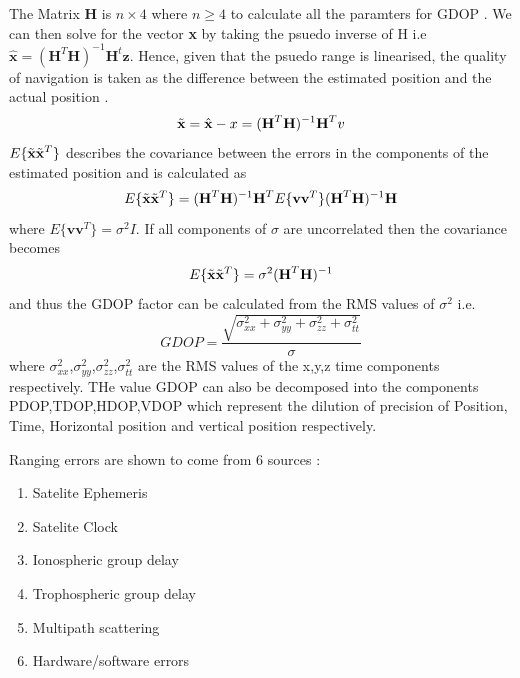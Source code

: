 The Matrix \textbf{H} is $n\times4$ where $n \geq 4$ to calculate all the paramters for GDOP \cite{jwo2001efficient}. We can then solve for the vector \textbf{x} by taking the psuedo inverse of H i.e $\hat{\textbf{x}} = (\textbf{H}^T\textbf{H})^{-1}\textbf{H}^t\textbf{z}$. Hence, given that the psuedo range is linearised, the quality of navigation is taken as the difference between the estimated position and the actual position \cite{jwo2001efficient}.
\begin{equation}
    \Tilde{\textbf{x}} = \hat{\textbf{x}} - x = (\textbf{H}^T\textbf{H})^{-1}\textbf{H}^Tv
\end{equation}
 $E\{\Tilde{\textbf{x}}\Tilde{\textbf{x}}^T\}$ describes the covariance between the errors in the components of the estimated position \cite{jwo2001efficient} and is calculated as 
 \begin{equation}
   E\{\Tilde{\textbf{x}}\Tilde{\textbf{x}}^T\} = (\textbf{H}^T\textbf{H})^{-1}\textbf{H}^TE\{\textbf{vv}^T\} (\textbf{H}^T\textbf{H})^{-1}\textbf{H}
 \end{equation}
 where $E\{\textbf{vv}^T\} = \sigma^2 I$. If all components of $\sigma$ are uncorrelated then the covariance becomes 
 \begin{equation}
     E\{\Tilde{\textbf{x}}\Tilde{\textbf{x}}^T\} = \sigma^2(\textbf{H}^T\textbf{H})^{-1}
 \end{equation}
and thus the GDOP factor can be calculated from the RMS values of $\sigma^2$ i.e.
\begin{equation}
    GDOP = \frac{\sqrt{\sigma_{xx}^2+\sigma_{yy}^2+ \sigma_{zz}^2+\sigma_{tt}^2}}{\sigma}
\end{equation} where $\sigma_{xx}^2$,$\sigma_{yy}^2$,$\sigma_{zz}^2$,$\sigma_{tt}^2$ are the RMS values of the x,y,z time components respectively. THe value GDOP can also be decomposed into the components PDOP,TDOP,HDOP,VDOP which represent the dilution of precision of Position, Time, Horizontal position and vertical position respectively.\par

Ranging errors are shown to come from 6 sources \cite{spilker1996global}:
\begin{enumerate}
    \item Satelite Ephemeris
    \item Satelite Clock
    \item Ionospheric group delay
    \item Trophospheric group delay
    \item Multipath scattering
    \item Hardware/software errors
\end{enumerate}




